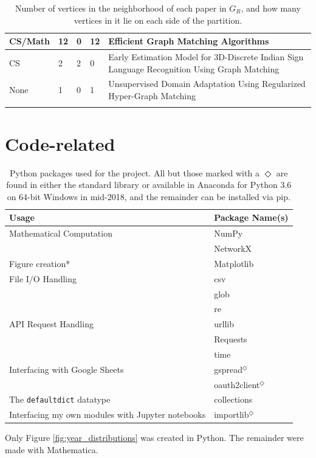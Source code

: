 \documentclass[12pt]{thesis}
\theoremstyle{plain}
\theoremstyle{definition}
\theoremstyle{remark}
\begin{document}
{\begin{singlespace}
\begin{longtable}{|L{0.095\textwidth}|C{0.04\textwidth}|C{0.045\textwidth}|C{0.045\textwidth}|L{0.7\textwidth}|}
CS/Math & 12 & 0 & 12 & Efficient Graph Matching Algorithms \\ \hline
CS & 2 & 2 & 0 & Early Estimation Model for 3D-Discrete Indian Sign Language Recognition Using Graph Matching \\ \hline
None & 1 & 0 & 1 & Unsupervised Domain Adaptation Using Regularized Hyper-Graph Matching \\ \hline
\caption{Number of vertices in the neighborhood of each paper in $G_R$, and how many vertices in it lie on each side of the partition.}
\label{tab:neighborhood_partition_counts}
\end{longtable}
\end{singlespace}

\section{Code-related}

\begin{table}[t]
\centering
\begin{tabular}{| l | l |}
\hline
Usage & Package Name(s) \\ \hline
Mathematical Computation & NumPy \\
& NetworkX \\
\hline
Figure creation* & Matplotlib \\ 
\hline
File I/O Handling & csv\\ 
& glob \\
& re \\
\hline
API Request Handling  & urllib \\
& Requests \\ 
& time \\
\hline
Interfacing with Google Sheets & gspread$^\Diamond$ \\
& oauth2client$^\Diamond$ \\
\hline
The \verb+defaultdict+ datatype & collections \\
\hline
Interfacing my own modules with Jupyter notebooks & importlib$^\Diamond$ \\ 
\hline
\end{tabular}
\caption{Python packages used for the project. All but those marked with a $\Diamond$ are found in either the standard library or available in Anaconda for Python 3.6 on 64-bit Windows in mid-2018, and the remainder can be installed via pip.}
\footnotesize *Only Figure \ref{fig:year_distributions} was created in Python. The remainder were made with Mathematica.
\label{tab:python_packages}
\end{table}

}
\end{document}
